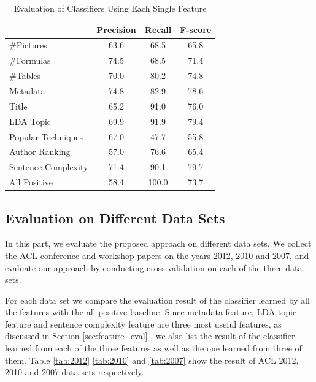 \documentclass[11pt,letterpaper]{article}
\begin{document}
\begin{table}
\begin{center}
\begin{tabular}{|p{2cm}|c|c|c|}
\hline 
& \bf Precision & \bf Recall & \bf F-score \\ \hline
\#Pictures & 63.6 & 68.5 & 65.8 \\ \hline
\#Formulas	& 74.5	& 68.5	& 71.4\\ \hline
\#Tables	&70.0 &	80.2	& 74.8\\ \hline
Metadata	& 74.8	& 82.9	& 78.6\\ \hline
Title	& 65.2	& 91.0 &	76.0\\ \hline
LDA Topic &	69.9	&91.9&	79.4\\ \hline
Popular Techniques	& 67.0	& 47.7	&55.8\\ \hline
Author Ranking	& 57.0	& 76.6	& 65.4\\ \hline
Sentence Complexity	& 71.4	& 90.1 &	79.7\\ \hline
All Positive	& 58.4	& 100.0	& 73.7\\\hline
\end{tabular}
\end{center}
\caption{Evaluation of Classifiers Using Each Single Feature}
\label{tab:feature_eval}
\end{table}



\subsection{Evaluation on Different Data Sets}
In this part, we evaluate the proposed approach on different data sets.
We collect the ACL conference and workshop papers on the years 2012, 2010 and 2007,
and evaluate our approach by conducting cross-validation on each of the three data sets.

For each data set we compare the evaluation result of the classifier learned by all the features with the all-positive baseline.
Since metadata feature, LDA topic feature and sentence complexity feature are three most useful features, as discussed in Section \ref{sec:feature_eval}
, we also list the result of the classifier learned from each of the three features as well as the one learned from three of them. 
Table \ref{tab:2012} \ref{tab:2010} and \ref{tab:2007} show the result of ACL 2012, 2010 and 2007 data sets respectively.
\end{document}
